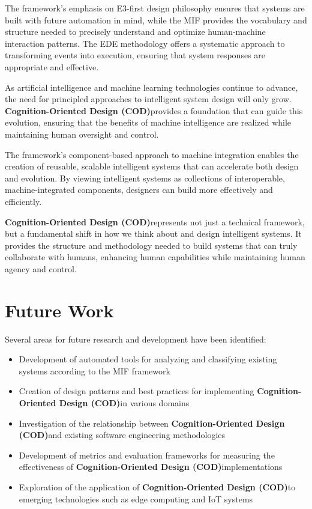 \documentclass[12pt,a4paper]{article}
\newcommand{\cod}{\textbf{Cognition-Oriented Design (COD)}}
\begin{document}
The framework's emphasis on E3-first design philosophy ensures that systems are built with future automation in mind, while the MIF provides the vocabulary and structure needed to precisely understand and optimize human-machine interaction patterns. The EDE methodology offers a systematic approach to transforming events into execution, ensuring that system responses are appropriate and effective.

As artificial intelligence and machine learning technologies continue to advance, the need for principled approaches to intelligent system design will only grow. \cod provides a foundation that can guide this evolution, ensuring that the benefits of machine intelligence are realized while maintaining human oversight and control.

The framework's component-based approach to machine integration enables the creation of reusable, scalable intelligent systems that can accelerate both design and evolution. By viewing intelligent systems as collections of interoperable, machine-integrated components, designers can build more effectively and efficiently.

\cod represents not just a technical framework, but a fundamental shift in how we think about and design intelligent systems. It provides the structure and methodology needed to build systems that can truly collaborate with humans, enhancing human capabilities while maintaining human agency and control.

\section{Future Work}

Several areas for future research and development have been identified:

\begin{itemize}
\item Development of automated tools for analyzing and classifying existing systems according to the MIF framework
\item Creation of design patterns and best practices for implementing \cod in various domains
\item Investigation of the relationship between \cod and existing software engineering methodologies
\item Development of metrics and evaluation frameworks for measuring the effectiveness of \cod implementations
\item Exploration of the application of \cod to emerging technologies such as edge computing and IoT systems
\end{itemize}
\end{document}
